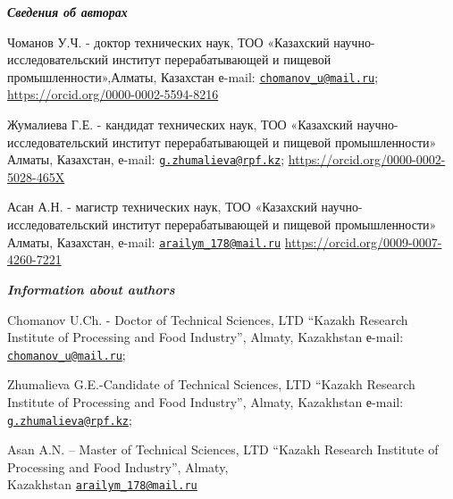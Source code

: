 \begin{authorinfo}
\emph{{\bfseries Сведения об авторах}}

Чоманов У.Ч. - доктор технических наук, ТОО «Казахский
научно-исследовательский институт перерабатывающей и пищевой
промышленности»,Алматы, Казахстан е-mail:
\href{mailto:chomanov\_u@mail.ru}{\nolinkurl{chomanov\_u@mail.ru}};
\url{https://orcid.org/0000-0002-5594-8216}

Жумалиева Г.Е. - кандидат технических наук, ТОО «Казахский
научно-исследовательский институт перерабатывающей и пищевой
промышленности» Алматы, Казахстан, е-mail:
\href{mailto:g.zhumalieva@rpf.kz}{\nolinkurl{g.zhumalieva@rpf.kz}};
\url{https://orcid.org/0000-0002-5028-465X}

Асан А.Н. - магистр технических наук, ТОО «Казахский
научно-исследовательский институт перерабатывающей и пищевой
промышленности» Алматы, Казахстан, е-mail:
\href{mailto:arailym\_178@mail.ru}{\nolinkurl{arailym\_178@mail.ru}}
\url{https://orcid.org/0009-0007-4260-7221}

\emph{{\bfseries Information about authors}}

Chomanov U.Ch. - Doctor of Technical Sciences, LTD ``Kazakh Research
Institute of Processing and Food Industry'', Almaty, Kazakhstan е-mail:
\href{mailto:chomanov\_u@mail.ru}{\nolinkurl{chomanov\_u@mail.ru}};

Zhumalieva G.E.-Candidate of Technical Sciences, LTD ``Kazakh Research
Institute of Processing and Food Industry'', Almaty, Kazakhstan е-mail:
\href{mailto:g.zhumalieva@rpf.kz}{\nolinkurl{g.zhumalieva@rpf.kz}};

Asan A.N. -- Master of Technical Sciences, LTD ``Kazakh Research
Institute of Processing and Food Industry'', Almaty, \\Kazakhstan
\href{mailto:arailym\_178@mail.ru}{\nolinkurl{arailym\_178@mail.ru}}\
\end{authorinfo}
